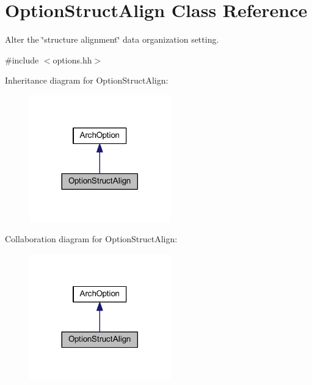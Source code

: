 \hypertarget{class_option_struct_align}{}\section{Option\+Struct\+Align Class Reference}
\label{class_option_struct_align}


Alter the \char`\"{}structure alignment\char`\"{} data organization setting.  




{\ttfamily \#include $<$options.\+hh$>$}



Inheritance diagram for Option\+Struct\+Align\+:
\nopagebreak
\begin{figure}[H]
\begin{center}
\leavevmode
\includegraphics[width=173pt]{class_option_struct_align__inherit__graph}
\end{center}
\end{figure}


Collaboration diagram for Option\+Struct\+Align\+:
\nopagebreak
\begin{figure}[H]
\begin{center}
\leavevmode
\includegraphics[width=173pt]{class_option_struct_align__coll__graph}
\end{center}
\end{figure}

